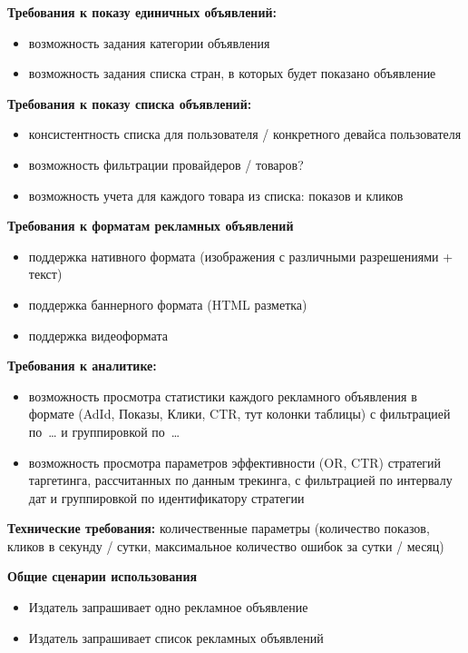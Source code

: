 \documentclass[times]{itmo-student-thesis}
\begin{document}
\textbf{Требования к показу единичных объявлений:}
\begin{itemize}
	\item возможность задания категории объявления
	\item возможность задания списка стран, в которых будет показано объявление
\end{itemize}

\textbf{Требования к показу списка объявлений:}
\begin{itemize}
	\item консистентность списка для пользователя / конкретного девайса пользователя
	\item возможность фильтрации провайдеров / товаров?
	\item возможность учета для каждого товара из списка: показов и кликов
\end{itemize}

\textbf{Требования к форматам рекламных объявлений}
\begin{itemize}
	\item поддержка нативного формата (изображения с различными разрешениями + текст)
	\item поддержка баннерного формата (HTML разметка)
	\item поддержка видеоформата
\end{itemize}

\textbf{Требования к аналитике:}
\begin{itemize}
	\item возможность просмотра статистики каждого рекламного объявления в формате (AdId, Показы, Клики, CTR, тут колонки таблицы) с фильтрацией по … и группировкой по …
	\item возможность просмотра параметров эффективности (OR, CTR) стратегий таргетинга, рассчитанных по данным трекинга, с фильтрацией по интервалу дат и группировкой по идентификатору стратегии
\end{itemize}

\textbf{Технические требования:} количественные параметры (количество показов, кликов в секунду / сутки, максимальное количество ошибок за сутки / месяц)

\textbf{Общие сценарии использования}
\begin{itemize}
	\item Издатель запрашивает одно рекламное объявление
	\item Издатель запрашивает список рекламных объявлений
\end{itemize}
\end{document}
